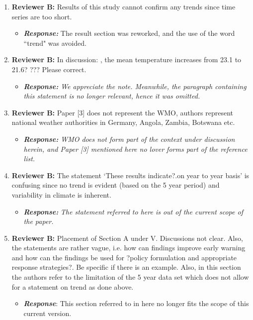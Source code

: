 \documentclass[a4paper, 12pt, conference]{ieeeconf}      %
\begin{document}
\begin{enumerate}
  
  \item \textbf{Reviewer B:}  Results of this study cannot confirm any trends since time series are too short. 
   \begin{itemize}
  	\item \emph{\textbf{Response:}} The result section was reworked, and the use of the word ``trend" was avoided.
  \end{itemize}
  
  
  
  \item \textbf{Reviewer B:}  In discussion: , the mean temperature increases from 23.1 to 21.6? ??? Please correct.
  
    \begin{itemize}
  	\item \emph{\textbf{Response:} We appreciate the note. Meanwhile, the paragraph containing this statement is no longer relevant, hence it was omitted.}
  \end{itemize}

  \item \textbf{Reviewer B:} Paper [3] does not represent the WMO, authors represent national weather authorities in Germany, Angola, Zambia, Botswana etc. 
   \begin{itemize}
  	\item \emph{\textbf{Response:}  WMO does not form part of the context under discussion herein, and Paper [3] mentioned here no lover forms part of the reference list.} 
  \end{itemize}

  \item \textbf{Reviewer B:}  The statement `These results indicate?.on year to year basis' is confusing since no trend is evident (based on the 5 year period) and variability in climate is inherent. 
  \begin{itemize}
  	\item \emph{\textbf{Response:}}
  	\emph{The statement referred to here is out of the current scope of the paper.}
  \end{itemize}

  \item \textbf{Reviewer B:}  Placement of Section A under V. Discussions not clear. Also, the statements are rather vague, i.e. how can findings improve early warning and how can the findings be used for ?policy formulation and appropriate response strategies?. Be specific if there is an example. Also, in this section the authors refer to the limitation of the 5 year data set which does not allow for a statement on trend as done above. 
 	\begin{itemize}
	\item \textbf{\emph{Response}}: This section referred to in here no longer fits the scope of this current version.
\end{itemize}


\end{enumerate}
\end{document}
